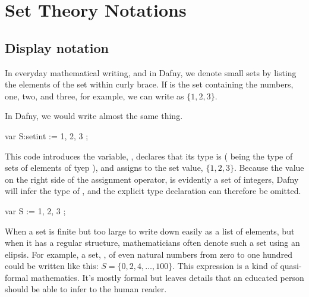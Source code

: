 \documentclass[letterpaper,10pt,english]{sphinxmanual}
\begin{document}
\section{Set Theory Notations}
\label{\detokenize{07-set-theory:set-theory-notations}}

\subsection{Display notation}
\label{\detokenize{07-set-theory:display-notation}}
In everyday mathematical writing, and in Dafny, we denote small sets by
listing the elements of the set within curly brace. If  is the set
containing the numbers, one, two, and three, for example, we can write
 as \(\{ 1, 2, 3 \}.\)

In Dafny, we would write almost the same thing.

\begin{sphinxVerbatim}[commandchars=\\\{\}]
var S:set\PYGZlt{}int\PYGZgt{} := \PYGZob{} 1, 2, 3 \PYGZcb{};
\end{sphinxVerbatim}

This code introduces the variable, , declares that its type is
 ( being the type of  sets
of elements of tyep ), and assigns to  the set value, \(\{
1, 2, 3 \}.\) Because the value on the right side of the assignment
operator, is evidently a set of integers, Dafny will infer the type of
, and the explicit type declaration can therefore be omitted.

\begin{sphinxVerbatim}[commandchars=\\\{\}]
var S := \PYGZob{} 1, 2, 3 \PYGZcb{};
\end{sphinxVerbatim}

When a set is finite but too large to write down easily as a list of
elements, but when it has a regular structure, mathematicians often
denote such a set using an elipsis. For example, a set, , of even
natural numbers from zero to one hundred could be written like this:
\(S = \{ 0, 2, 4, \ldots, 100 \}.\) This expression is a kind of
quasi-formal mathematics. It’s mostly formal but leaves details that
an educated person should be able to infer to the human reader.
\end{document}
